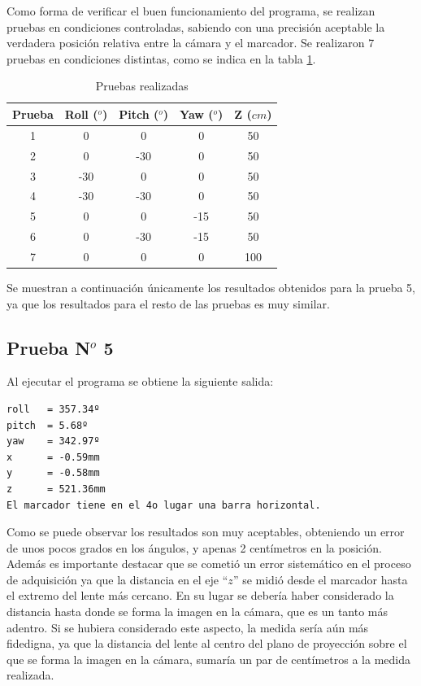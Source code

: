 \documentclass[main]{subfiles}
\begin{document}
Como forma de verificar el buen funcionamiento del programa, se realizan pruebas en condiciones controladas, sabiendo con una precisión aceptable la verdadera posición relativa entre la cámara y el marcador. Se realizaron 7 pruebas en condiciones distintas, como se indica en la tabla \ref{tab:pruebas}.
\begin{table}[H]
\centering
\begin{tabular}{|c|c|c|c|c|} 
\hline \cellcolor[gray]{0.8} \textbf{Prueba} & \cellcolor[gray]{0.8} \textbf{Roll ($^o$)} & \cellcolor[gray]{0.8} \textbf{Pitch ($^o$)} & \cellcolor[gray]{0.8} \textbf{Yaw ($^o$)} & \cellcolor[gray]{0.8} \textbf{Z ($cm$)}\\ 
\hline 1 & 0   & 0   & 0   & 50 \\ 
\hline 2 & 0   & -30 & 0   & 50 \\ 
\hline 3 & -30 & 0   & 0   & 50 \\ 
\hline 4 & -30 & -30 & 0   & 50 \\ 
\hline 5 & 0   & 0   & -15 & 50 \\ 
\hline 6 & 0   & -30 & -15 & 50 \\ 
\hline 7 & 0   & 0   & 0   & 100 \\
\hline
\end{tabular} 
\caption{Pruebas realizadas}
\label{tab:pruebas}
\end{table}

Se muestran a continuación únicamente los resultados obtenidos para la prueba 5, ya que los resultados para el resto de las pruebas es muy similar.

\subsection{Prueba N$^o$ 5}

Al ejecutar el programa se obtiene la siguiente salida:

\begin{verbatim}
roll   = 357.34º
pitch  = 5.68º
yaw    = 342.97º
x      = -0.59mm
y      = -0.58mm
z      = 521.36mm
El marcador tiene en el 4o lugar una barra horizontal.
\end{verbatim}

Como se puede observar los resultados son muy aceptables, obteniendo un error de unos pocos grados en los ángulos, y apenas 2 centímetros en la posición. Además es importante destacar que se cometió un error sistemático en el proceso de adquisición ya que la distancia en el eje ``$z$'' se midió desde el marcador hasta el extremo del lente más cercano. En su lugar se debería haber considerado la distancia hasta donde se forma la imagen en la cámara, que es un tanto más adentro. Si se hubiera considerado este aspecto, la medida sería aún más fidedigna, ya que la distancia del lente al centro del plano de proyección sobre el que se forma la imagen en la cámara, sumaría un par de centímetros a la medida realizada.
\end{document}

